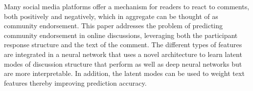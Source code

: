 Many social media platforms offer a mechanism for readers to react to comments, both positively and negatively, which in aggregate can be thought of as community endorsement. This paper addresses the problem of predicting community endorsement in online discussions, leveraging both the participant response structure and the text of the comment. The different types of features are integrated in a neural network that uses a novel architecture to learn latent modes of discussion structure that perform as well as deep neural networks but are more interpretable. In addition, the latent modes can be used to weight text features thereby improving prediction accuracy.
